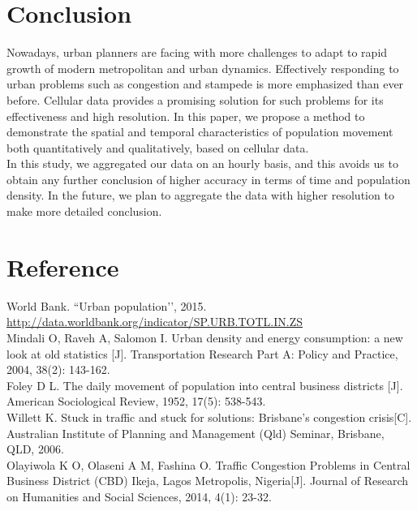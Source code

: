 \documentclass[hidelinks,12pt]{article}
\begin{document}
	\section{Conclusion}\label{sec:con}
	
Nowadays, urban planners are facing with more challenges to adapt to rapid growth of modern metropolitan and urban dynamics. Effectively responding to urban problems such as congestion and stampede is more emphasized than ever before. Cellular data provides a promising solution for such problems for its effectiveness and high resolution. In this paper, we propose a method to demonstrate the spatial and temporal characteristics of population movement both quantitatively and qualitatively, based on cellular data. \\

In this study, we aggregated our data on an hourly basis, and this avoids us to obtain any further conclusion of higher accuracy in terms of time and population density. In the future, we plan to aggregate the data with higher resolution to make more detailed conclusion.
	
	
	
	\section{Reference}\label{sec:ref}

\noindent World Bank. “Urban population’’, 2015.\\
\url{http://data.worldbank.org/indicator/SP.URB.TOTL.IN.ZS}\\

\noindent Mindali O, Raveh A, Salomon I. Urban density and energy consumption: a new look at old statistics [J]. Transportation Research Part A: Policy and Practice, 2004, 38(2): 143-162.\\

\noindent Foley D L. The daily movement of population into central business districts [J]. American Sociological Review, 1952, 17(5): 538-543.\\

\noindent Willett K. Stuck in traffic and stuck for solutions: Brisbane’s congestion crisis[C]. Australian Institute of Planning and Management (Qld) Seminar, Brisbane, QLD, 2006.\\

\noindent Olayiwola K O, Olaseni A M, Fashina O. Traffic Congestion Problems in Central Business District (CBD) Ikeja, Lagos Metropolis, Nigeria[J]. Journal of Research on Humanities and Social Sciences, 2014, 4(1): 23-32.\\
\end{document}
